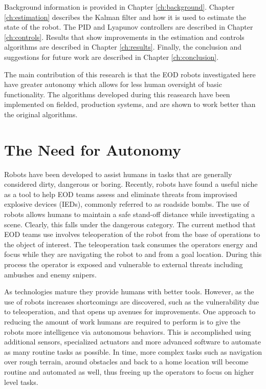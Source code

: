 Background information is provided in Chapter \ref{ch:background}. Chapter \ref{ch:estimation} describes the Kalman filter and how it is used to estimate the state of the robot. The PID and Lyapunov controllers are described in Chapter \ref{ch:controls}. Results that show improvements in the estimation and controls algorithms are described in Chapter \ref{ch:results}. Finally, the conclusion and suggestions for future work are described in Chapter \ref{ch:conclusion}.

The main contribution of this research is that the EOD robots investigated here have greater autonomy which allows for less human oversight of basic functionality. The algorithms developed during this reasearch have been implemented on fielded, production systems, and are shown to work better than the original algorithms.

\section{The Need for Autonomy}
\label{sec:needforautonomy}
Robots have been developed to assist humans in tasks that are generally considered dirty, dangerous or boring. Recently, robots have found a useful niche as a tool to help EOD teams assess and eliminate threats from improvised explosive devices (IEDs), commonly referred to as roadside bombs. The use of robots allows humans to maintain a safe stand-off distance while investigating a scene. Clearly, this falls under the dangerous category. The current method that EOD teams use involves teleoperation of the robot from the base of operations to the object of interest. The teleoperation task consumes the operators energy and focus while they are navigating the robot to and from a goal location. During this process the operator is exposed and vulnerable to external threats including ambushes and enemy snipers.

As technologies mature they provide humans with better tools. However, as the use of robots increases shortcomings are discovered, such as the vulnerability due to teleoperation, and that opens up avenues for improvements. One approach to reducing the amount of work humans are required to perform is to give the robots more intelligence via autonomous behaviors. This is accomplished using additional sensors, specialized actuators and more advanced software to automate as many routine tasks as possible. In time, more complex tasks such as navigation over rough terrain, around obstacles and back to a home location will become routine and automated as well, thus freeing up the operators to focus on higher level tasks.

